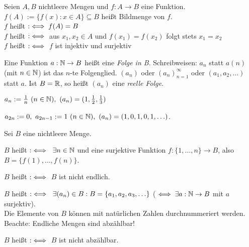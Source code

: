 \documentclass[a4paper,twoside,DIV15,BCOR12mm]{scrbook}
\begin{document}
\begin{definition}
Seien $A,B$ nichtleere Mengen und $f: A \rightarrow B$ eine Funktion. $f(A) := \{ f(x): x \in A \} \subseteq B$ heißt Bildmenge von $f$. \\
$f$ heißt  $:\iff f(A)=B$ \\
$f$ heißt  $:\iff $ aus $x_1,x_2 \in A$ und $f(x_1) = f(x_2)$ folgt stets $x_1=x_2$ \\
$f$ heißt  $:\iff$ $f$ ist injektiv und surjektiv
\end{definition}

\begin{definition}
Eine Funktion $a:\mathbb{N} \rightarrow B$ heißt eine \textit{Folge in B}. Schreibweisen: $a_n$ statt $a(n)$ (mit $n \in \mathbb{N}$) ist das $n$-te Folgenglied. $(a_n)$ oder $(a_n)_{n=1}^\infty$ oder $(a_1, a_2,\ldots)$ statt $a$. Ist $B=\mathbb{R}$, so heißt $(a_n)$ eine \textit{reelle Folge}.
\end{definition}

\begin{beispiele}
\item $a_n := \frac{1}{n} \ (n \in \mathbb{N}), \ (a_n) = (1,\frac{1}{2},\frac{1}{3})$ \\
\item $a_{2n} := 0,\  a_{2n-1} := 1 \ (n \in \mathbb{N}), \ (a_n) = (1,0,1,0,1,\ldots)$.
\end{beispiele}

\begin{definition}
Sei $B$ eine nichtleere Menge.
\begin{liste}
\item $B$ heißt  $:\iff \ \exists n \in \mathbb{N}$ und eine surjektive Funktion $f:\{1,\ldots,n\} \rightarrow B$, also $B=\{f(1),\ldots,f(n)\}$.
\item $B$ heißt  $:\iff$ $B$ ist nicht endlich.
\item $B$ heißt  $:\iff \ \exists  (a_n) \in B: B=\{a_1,a_2,a_3,\ldots\}$ ($\iff \exists a: \mathbb{N} \rightarrow B$  mit $a$ surjektiv).\\
\glqq Die Elemente von $B$ können mit natürlichen Zahlen durchnummeriert werden.\grqq\\
Beachte: Endliche Mengen sind abzählbar!
\item $B$ heißt  $:\iff$ $B$ ist nicht abzählbar.
\end{liste}
\end{definition}
\end{document}

